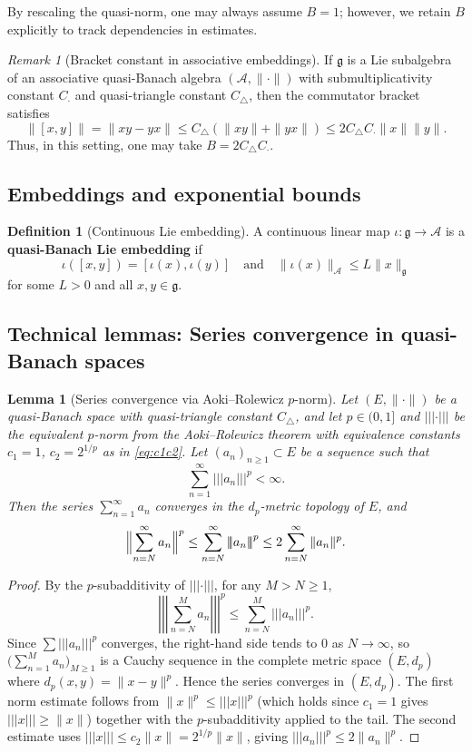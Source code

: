 \documentclass[10pt]{amsart}
\newtheorem{lemma}[theorem]{Lemma}
\theoremstyle{definition}
\newtheorem{definition}[theorem]{Definition}
\theoremstyle{remark}
\newtheorem{remark}[theorem]{Remark}
\numberwithin{equation}{section}
\newcommand{\Ctri}{C_{\triangle}}    %
\newcommand{\Cmult}{C_{\cdot}}       %
\newcommand{\Cbracket}{B}            %
\newcommand{\pnorm}[1]{\left\vert\!\left\vert\!\left\vert #1 \right\vert\!\right\vert\!\right\vert} %
\begin{document}
By rescaling the quasi-norm, one may always assume $\Cbracket=1$; however, we retain
$\Cbracket$ explicitly to track dependencies in estimates.

\begin{remark}[Bracket constant in associative embeddings]\label{rem:bracket-associative}
If $\mathfrak{g}$ is a Lie subalgebra of an associative quasi-Banach algebra
$(\mathcal{A},\|\cdot\|)$ with submultiplicativity constant $\Cmult$ and quasi-triangle
constant $\Ctri$, then the commutator bracket satisfies
\[
  \|[x,y]\| = \|xy - yx\| \le \Ctri(\|xy\| + \|yx\|) \le 2\Ctri\Cmult\|x\|\|y\|.
\]
Thus, in this setting, one may take $\Cbracket = 2\Ctri\Cmult$.
\end{remark}

\subsection{Embeddings and exponential bounds}

\begin{definition}[Continuous Lie embedding]
A continuous linear map $\iota:\mathfrak{g}\to\mathcal{A}$ is a \textbf{quasi-Banach Lie
embedding} if
\[
  \iota([x,y])=[\iota(x),\iota(y)] \quad\text{and}\quad
  \|\iota(x)\|_{\mathcal{A}}\le L\|x\|_{\mathfrak{g}}
\]
for some $L>0$ and all $x,y\in\mathfrak{g}$.
\end{definition}

\subsection{Technical lemmas: Series convergence in quasi-Banach spaces}

\begin{lemma}[Series convergence via Aoki--Rolewicz $p$-norm]%
\label{lem:series-convergence}
Let $(E,\|\cdot\|)$ be a quasi-Banach space with quasi-triangle constant $\Ctri$, and let
$p\in(0,1]$ and $\pnorm{\cdot}$ be the equivalent $p$-norm from the Aoki--Rolewicz
theorem with equivalence constants $c_1 = 1$, $c_2 = 2^{1/p}$ as in \eqref{eq:c1c2}.
Let $(a_n)_{n\ge 1}\subset E$ be a sequence such that
\[
  \sum_{n=1}^\infty \pnorm{a_n}^p < \infty.
\]
Then the series $\sum_{n=1}^\infty a_n$ converges in the $d_p$-metric topology of $E$,
and
\[
  \Bigl\|\sum_{n=N}^\infty a_n\Bigr\|^p \le \sum_{n=N}^\infty \pnorm{a_n}^p
  \le 2\sum_{n=N}^\infty \|a_n\|^p.
\]
\end{lemma}

\begin{proof}
By the $p$-subadditivity of $\pnorm{\cdot}$, for any $M > N \ge 1$,
\[
  \pnorm{\sum_{n=N}^M a_n}^p \le \sum_{n=N}^M \pnorm{a_n}^p.
\]
Since $\sum \pnorm{a_n}^p$ converges, the right-hand side tends to $0$ as $N\to\infty$,
so $\bigl(\sum_{n=1}^M a_n\bigr)_{M\ge 1}$ is a Cauchy sequence in the complete metric
space $(E, d_p)$ where $d_p(x,y) = \|x-y\|^p$.  Hence the series converges in
$(E, d_p)$.  The first norm estimate follows from $\|x\|^p \le \pnorm{x}^p$ (which holds
since $c_1=1$ gives $\pnorm{x}\ge\|x\|$) together with the $p$-subadditivity applied to
the tail.  The second estimate uses $\pnorm{x}\le c_2\|x\| = 2^{1/p}\|x\|$, giving
$\pnorm{a_n}^p \le 2\|a_n\|^p$.
\end{proof}
\end{document}
